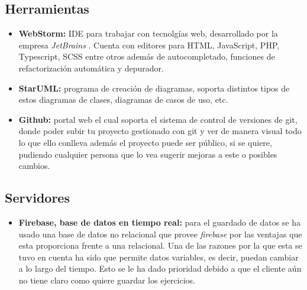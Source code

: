 \subsection{Herramientas}
\begin{itemize}
    \item\textbf{WebStorm:} IDE para trabajar con tecnolgías web, desarrollado por la empresa
    \textit{JetBrains} \cite{jetbrains}. Cuenta con editores para HTML, JavaScript, PHP,
    Typescript, SCSS entre otros además de autocompletado, funciones de refactorización
    automática y depurador.
    \item\textbf{StarUML:} programa de creación de diagramas, soporta distintos tipos de estos
    diagramas de clases, diagramas de casos de uso, etc.
    \item\textbf{Github:} portal web el cual soporta el sistema de control de versiones de git,
    donde poder subir tu proyecto gestionado con git y ver de manera visual todo lo que ello conlleva
    además el proyecto puede ser público, si se quiere, pudiendo cualquier persona que lo vea
    sugerir mejoras a este o posibles cambios.
\end{itemize}

\subsection{Servidores}
\begin{itemize}
    \item\textbf{Firebase, base de datos en tiempo real:} para el guardado de datos se ha usado
    una base de datos no relacional que provee \textit{firebase} por las ventajas que esta proporciona
    frente a una relacional. Una de las razones por la que esta se tuvo en cuenta ha sido que permite
    datos variables, es decir, puedan cambiar a lo largo del tiempo. Esto se le ha dado prioridad
    debido a que el cliente aún no tiene claro como quiere guardar los ejercicios.
\end{itemize}
